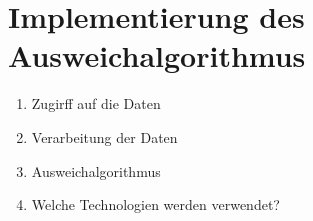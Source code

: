 \section{Implementierung des Ausweichalgorithmus}

\begin{enumerate}
    \item Zugirff auf die Daten
    \item Verarbeitung der Daten
    \item Ausweichalgorithmus
    \item Welche Technologien werden verwendet?
\end{enumerate}

\newpage
